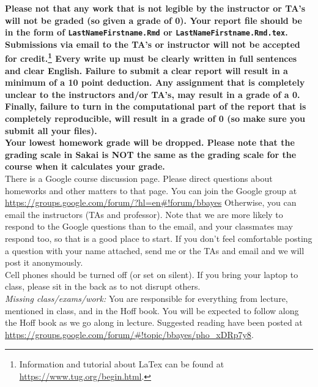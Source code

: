 \documentclass[11pt]{article}
\begin{document}
\textbf{Please not that any work that is not legible by the instructor or TA's will not be graded (so given a grade of 0). Your report file should be in the form of \texttt{LastNameFirstname.Rmd} or  \texttt{LastNameFirstname.Rmd.tex}. 
Submissions via email to the TA's or instructor will not be accepted for credit.\footnote{Information and tutorial about LaTex can be found at \url{https://www.tug.org/begin.html}.} Every write up must be clearly written in full sentences and clear English. Failure to submit a clear report will result in a minimum of a 10 point deduction. Any assignment that is completely unclear to the instructors and/or TA's, may result in a grade of a 0. Finally, failure to turn in the computational part of the report that is completely reproducible, will result in a grade of 0 (so make sure you submit all your files).  }   \\









\textbf{Your lowest homework grade will be dropped. Please note that the grading scale in Sakai is NOT the same as the grading scale for the course when it calculates your grade.}\\

There is a Google course discussion page. Please direct questions about homeworks and other matters to that page. You can join the Google group at \url{https://groups.google.com/forum/?hl=en#!forum/bbayes}
Otherwise, you can email the instructors (TAs and professor). Note that we are more likely to respond to the Google questions than to the email, and your classmates may respond too, so that is a good place to start. If you don't feel comfortable posting a question with your name attached, send me or the TAs and email and we will post it anonymously.\\

Cell phones should be turned off (or set on silent). If you bring your laptop to class, please sit in the back as to not disrupt others. \\





\emph{Missing class/exams/work:}
You are responsible for everything from lecture, mentioned in class, and in the Hoff book. You will be expected to follow along the Hoff book as we go along in lecture. Suggested reading have been posted at \url{https://groups.google.com/forum/#!topic/bbayes/pho_xDRp7y8}.\\
\end{document}
